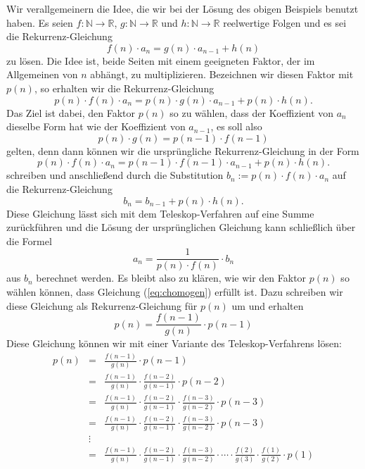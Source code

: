 Wir verallgemeinern die Idee, die wir bei der Lösung des obigen Beispiels benutzt haben.  Es seien
$f:\mathbb{N} \rightarrow \mathbb{R}$, $g:\mathbb{N} \rightarrow \mathbb{R}$ und 
$h:\mathbb{N} \rightarrow \mathbb{R}$ 
reelwertige Folgen und es sei die Rekurrenz-Gleichung
\[ 
f(n) \cdot a_n = g(n) \cdot a_{n-1} + h(n)
\]
zu lösen.  Die Idee ist, beide Seiten mit einem geeigneten Faktor, der im Allgemeinen von $n$ abhängt, zu
multiplizieren.  Bezeichnen wir diesen Faktor mit $p(n)$, so erhalten wir die Rekurrenz-Gleichung
\[ 
p(n) \cdot f(n) \cdot a_n = p(n) \cdot g(n) \cdot a_{n-1} + p(n) \cdot h(n).
\]
Das Ziel ist dabei, den Faktor $p(n)$ so zu wählen, dass der Koeffizient von $a_n$ dieselbe Form hat wie der
Koeffizient von $a_{n-1}$, es soll also
\begin{equation}
  \label{eq:chomogen}
  p(n) \cdot g(n) = p(n-1) \cdot f(n-1)  
\end{equation}
gelten, denn dann können wir die ursprüngliche Rekurrenz-Gleichung in der Form
\[ 
p(n) \cdot f(n) \cdot a_n = p(n-1) \cdot f(n-1) \cdot a_{n-1} + p(n) \cdot h(n).
\]
schreiben und anschließend durch die Substitution $b_n := p(n) \cdot f(n) \cdot a_n$ auf die
Rekurrenz-Gleichung 
\[ 
b_n = b_{n-1} + p(n) \cdot h(n).
\]
Diese Gleichung lässt sich mit dem Teleskop-Verfahren auf eine Summe zurückführen und die Lösung der
ursprünglichen Gleichung kann schließlich über die Formel
\[ 
a_n = \frac{1}{p(n) \cdot f(n)} \cdot b_n
\]
aus $b_n$ berechnet werden.  Es bleibt also zu klären, wie wir den Faktor $p(n)$ so wählen können, dass
Gleichung (\ref{eq:chomogen}) erfüllt ist. Dazu schreiben wir diese Gleichung als Rekurrenz-Gleichung für
$p(n)$ um und erhalten
\[ 
  p(n) = \frac{f(n-1)}{g(n)} \cdot p(n-1) 
\]
Diese Gleichung können wir mit einer Variante des Teleskop-Verfahrens lösen:
\[ 
\begin{array}{lcl}
p(n) & = & \frac{f(n-1)}{g(n)} \cdot p(n-1)   \\[0.2cm]
     & = & \frac{f(n-1)}{g(n)} \cdot  \frac{f(n-2)}{g(n-1)} \cdot  p(n-2) \\[0.2cm]
     & = & \frac{f(n-1)}{g(n)} \cdot  \frac{f(n-2)}{g(n-1)} \cdot \frac{f(n-3)}{g(n-2)} \cdot  p(n-3) 
           \\[0.2cm]
     & = & \frac{f(n-1)}{g(n)} \cdot  \frac{f(n-2)}{g(n-1)} \cdot \frac{f(n-3)}{g(n-2)} \cdot  p(n-3) 
           \\[0.2cm]
     & \vdots & \\
     & = & \frac{f(n-1)}{g(n)} \cdot  \frac{f(n-2)}{g(n-1)} \cdot \frac{f(n-3)}{g(n-2)} \cdot \cdots
           \cdot \frac{f(2)}{g(3)} \cdot \frac{f(1)}{g(2)} \cdot p(1) 
           \\[0.2cm]
\end{array}
\]
